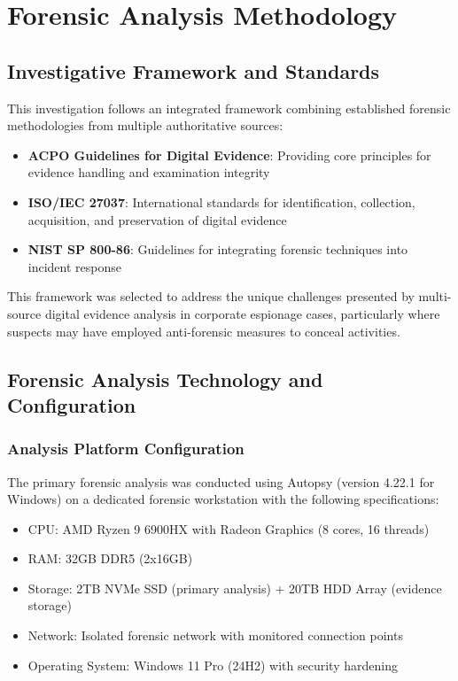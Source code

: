 \chapter{Forensic Analysis Methodology}

\section{Investigative Framework and Standards}
This investigation follows an integrated framework combining established forensic methodologies from multiple authoritative sources:

\begin{itemize}
    \item \textbf{ACPO Guidelines for Digital Evidence}: Providing core principles for evidence handling and examination integrity
    \item \textbf{ISO/IEC 27037}: International standards for identification, collection, acquisition, and preservation of digital evidence
    \item \textbf{NIST SP 800-86}: Guidelines for integrating forensic techniques into incident response
\end{itemize}

This framework was selected to address the unique challenges presented by multi-source digital evidence analysis in corporate espionage cases, particularly where suspects may have employed anti-forensic measures to conceal activities.

\section{Forensic Analysis Technology and Configuration}

\subsection{Analysis Platform Configuration}
The primary forensic analysis was conducted using Autopsy (version 4.22.1 for Windows) on a dedicated forensic workstation with the following specifications:

\begin{itemize}
    \item CPU: AMD Ryzen 9 6900HX with Radeon Graphics (8 cores, 16 threads)
    \item RAM: 32GB DDR5 (2x16GB)
    \item Storage: 2TB NVMe SSD (primary analysis) + 20TB HDD Array (evidence storage)
    \item Network: Isolated forensic network with monitored connection points
    \item Operating System: Windows 11 Pro (24H2) with security hardening
\end{itemize}

